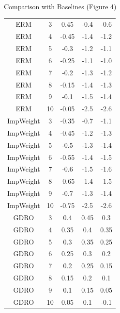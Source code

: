 \documentclass{beamer}
\begin{document}
\begin{frame}{Comparison with Baselines (Figure 4)}
\begin{table}[h]
\begin{tabular}{c|c|c|c|c}
            \hline
            ERM & 3 & 0.45 & -0.4 & -0.6 \\
            ERM & 4 & -0.45 & -1.4 & -1.2 \\
            ERM & 5 & -0.3 & -1.2 & -1.1 \\
            ERM & 6 & -0.25 & -1.1 & -1.0 \\
            ERM & 7 & -0.2 & -1.3 & -1.2 \\
            ERM & 8 & -0.15 & -1.4 & -1.3 \\
            ERM & 9 & -0.1 & -1.5 & -1.4 \\
            ERM & 10 & -0.05 & -2.5 & -2.6 \\
            \hline
            ImpWeight & 3 & -0.35 & -0.7 & -1.1 \\
            ImpWeight & 4 & -0.45 & -1.2 & -1.3 \\
            ImpWeight & 5 & -0.5 & -1.3 & -1.4 \\
            ImpWeight & 6 & -0.55 & -1.4 & -1.5 \\
            ImpWeight & 7 & -0.6 & -1.5 & -1.6 \\
            ImpWeight & 8 & -0.65 & -1.4 & -1.5 \\
            ImpWeight & 9 & -0.7 & -1.3 & -1.4 \\
            ImpWeight & 10 & -0.75 & -2.5 & -2.6 \\
            \hline
            GDRO & 3 & 0.4 & 0.45 & 0.3 \\
            GDRO & 4 & 0.35 & 0.4 & 0.35 \\
            GDRO & 5 & 0.3 & 0.35 & 0.25 \\
            GDRO & 6 & 0.25 & 0.3 & 0.2 \\
            GDRO & 7 & 0.2 & 0.25 & 0.15 \\
            GDRO & 8 & 0.15 & 0.2 & 0.1 \\
            GDRO & 9 & 0.1 & 0.15 & 0.05 \\
            GDRO & 10 & 0.05 & 0.1 & -0.1 \\
            \hline
        \end{tabular}
    \end{table}
\end{frame}
\end{document}
